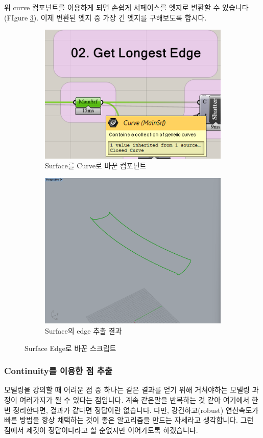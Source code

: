 \documentclass[11pt]{article}
\begin{document}
위 curve 컴포넌트를 이용하게 되면 손쉽게 서페이스를 엣지로 변환할 수 있습니다(FIgure \ref{fig:mbs_09_edgeToSrfInComponent}). 이제 변환된 엣지 중 가장 긴 엣지를 구해보도록 합시다.
\begin{figure}[H]
    \centering
   \begin{subfigure}{0.4\textwidth}
        \centering
        \includegraphics[width=.7\textwidth]{./img/mbs_09_srfToEdge.png}
        \caption{Surface를 Curve로 바꾼 컴포넌트}
        \label{fig:mbs_09_srfToEdge} 
   \end{subfigure} 
   \begin{subfigure}{0.4\textwidth}
        \centering
        \includegraphics[width=.7\textwidth]{./img/mbs_09_Edge.png}
        \caption{Surface의 edge 추출 결과}
        \label{fig:mbs_09_Edge} 
   \end{subfigure} 
   \caption{Surface Edge로 바꾼 스크립트}
   \label{fig:mbs_09_edgeToSrfInComponent}
\end{figure}



\subsubsection{Continuity를 이용한 점 추출}
모델링을 강의할 때 어려운 점 중 하나는 같은 결과를 얻기 위해 거쳐야하는 모델링 과정이 여러가지가 될 수 있다는 점입니다. 계속 같은말을 반복하는 것 같아
 여기에서 한번 정리한다면, 결과가 같다면 정답이란 없습니다. 다만, 강건하고(robust) 연산속도가 빠른 방법을 항상 채택하는 것이 좋은 알고리즘을 만드는 자세라고 생각합니다.
 그런 점에서 제것이 정답이다라고 할 순없지만 이어가도록 하겠습니다. 
\end{document}
